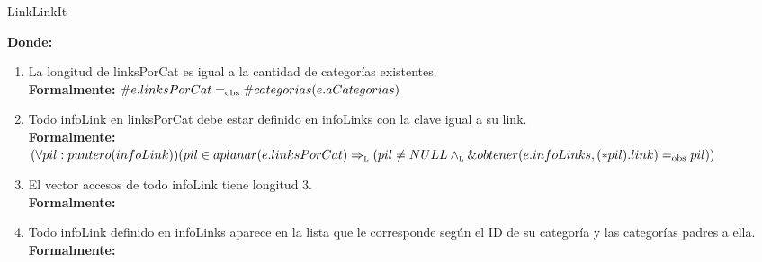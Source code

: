 \documentclass[10pt, a4paper]{article}
\begin{document}
\begin{Estructura}{LinkLinkIt}
    \begin{Tupla}
    \end{Tupla}

	\begin{Tupla}[infoLink]
	\end{Tupla}
\end{Estructura}

\mbox{}

{\bf Donde:}

\begin{enumerate}
  \item La longitud de linksPorCat es igual a la cantidad de categor\'ias existentes.\\
		{\bf Formalmente:} $\#e.linksPorCat =_{\mathrm{obs}} \#categorias(e.aCategorias)$

  \item Todo infoLink en linksPorCat debe estar definido en infoLinks con la clave igual a su link.\\
		{\bf Formalmente:} $(\forall pil:puntero(infoLink))(pil \in aplanar(e.linksPorCat) \Rightarrow_{\mathrm{\scriptscriptstyle{L}}} (pil \neq NULL \land_{\mathrm{\scriptscriptstyle{L}}} \&obtener(e.infoLinks, (*pil).link) =_{\mathrm{obs}} pil))$

  \item El vector accesos de todo infoLink tiene longitud 3.\\
		{\bf Formalmente:} 

  \item Todo infoLink definido en infoLinks aparece en la lista que le corresponde seg\'un el ID de su categor\'ia y las categor\'ias padres a ella.\\
		{\bf Formalmente:}
\end{enumerate}

~
\end{document}
